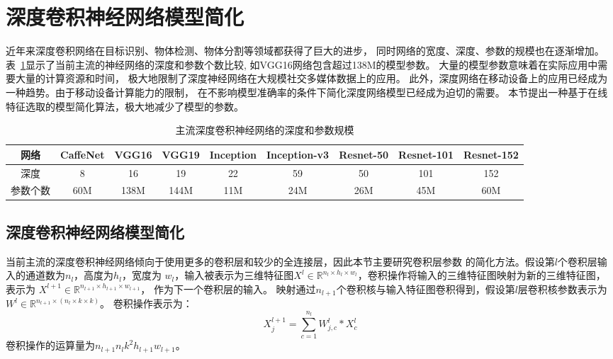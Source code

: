 \documentclass[doctor]{ustcthesis}
\def \R {\mathbb{R}}
\begin{document}
\section{深度卷积神经网络模型简化}
近年来深度卷积网络在目标识别、物体检测、物体分割等领域都获得了巨大的进步，
同时网络的宽度、深度、参数的规模也在逐渐增加。
表~\ref{tab:cnn-size}显示了当前主流的神经网络的深度和参数个数比较,
如VGG16网络包含超过138M的模型参数。
大量的模型参数意味着在实际应用中需要大量的计算资源和时间，
极大地限制了深度神经网络在大规模社交多媒体数据上的应用。
此外，深度网络在移动设备上的应用已经成为一种趋势。由于移动设备计算能力的限制，
在不影响模型准确率的条件下简化深度网络模型已经成为迫切的需要。
本节提出一种基于在线特征选取的模型简化算法，极大地减少了模型的参数。

\begin{table}[tbp]
    \centering
    \caption{主流深度卷积神经网络的深度和参数规模}
    \label{tab:cnn-size}
    \small
    \tabcolsep=0.5mm
    \begin{tabular}{|c|c|c|c|c|c|c|c|c|}
        \hline
        网络 & CaffeNet & VGG16 & VGG19 & Inception & Inception-v3 & Resnet-50
        & Resnet-101 & Resnet-152 \\
        \hline
        深度 & 8 & 16 & 19 & 22 & 59 & 50 & 101 & 152\\
        参数个数 & 60M & 138M & 144M & 11M & 24M & 26M & 45M & 60M \\
        \hline
    \end{tabular}
    \vspace{1em}
\end{table}

\subsection{深度卷积神经网络模型简化}
当前主流的深度卷积神经网络倾向于使用更多的卷积层和较少的全连接层，因此本节主要研究卷积层参数
的简化方法。假设第$l$个卷积层输入的通道数为$n_l$，高度为$h_l$，宽度为
$w_l$，输入被表示为三维特征图$X^l \in \R^{n_l \times h_l \times
w_l}$，卷积操作将输入的三维特征图映射为新的三维特征图，表示为
$X^{l+1} \in \R^{n_{l+1} \times h_{l+1} \times w_{l+1}}$，
作为下一个卷积层的输入。
映射通过$n_{l+1}$个卷积核与输入特征图卷积得到，假设第$l$层卷积核参数表示为
$W^l\in \R^{n_{l+1} \times (n_l \times k \times k)}$。
卷积操作表示为：
\begin{equation}
    X_j^{l+1} = \sum_{c=1}^{n_l}{W_{j,c}^l \ast X_c^l}
\end{equation}
卷积操作的运算量为$n_{l+1} n_l k^2 h_{l+1} w_{l+1}$。
\end{document}
